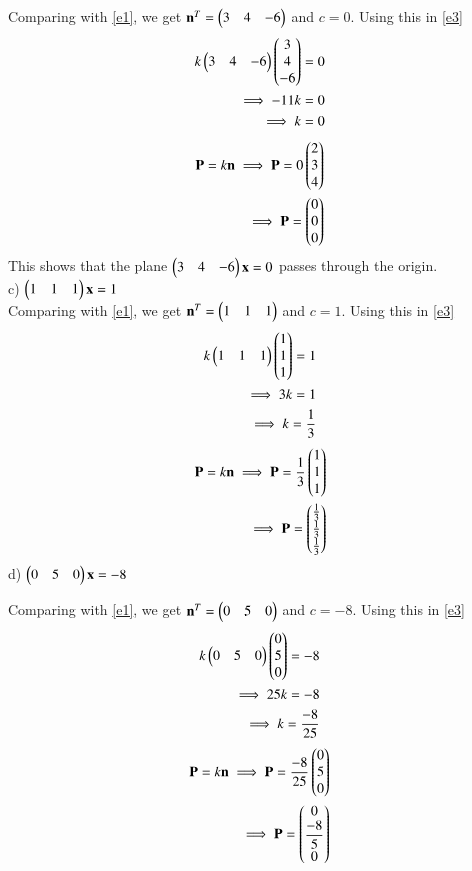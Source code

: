 \documentclass[journal,12pt,twocolumn]{IEEEtran}
\begin{document}
Comparing with \eqref{e1}, we get $\mathbf{n}^T = \begin{pmatrix}3&4&-6\end{pmatrix}$ and  $c=0$. Using this in \eqref{e3}
\begin{align}
	k\begin{pmatrix}3&4&-6\end{pmatrix}\begin{pmatrix}3\\4\\-6\end{pmatrix} = 0\\
	\implies -11k = 0\\
	\implies k = 0
\end{align}
\begin{align}
	\mathbf{P} = k\mathbf{n}
	\implies\mathbf{P} = 0\begin{pmatrix}2\\3\\4\end{pmatrix}\\
	\implies\mathbf{P}= \begin{pmatrix}0\\0\\0\end{pmatrix}
\end{align}
This shows that the plane $\begin{pmatrix}3&4&-6\end{pmatrix}\mathbf{x} = 0$ passes through the origin.\\

c) $\begin{pmatrix}1&1&1\end{pmatrix}\mathbf{x} = 1$\\

Comparing with \eqref{e1}, we get $\mathbf{n}^T = \begin{pmatrix}1&1&1\end{pmatrix}$ and  $c=1$. Using this in \eqref{e3}
\begin{align}
	k\begin{pmatrix}1&1&1\end{pmatrix}\begin{pmatrix}1\\1\\1\end{pmatrix} = 1\\
	\implies 3k = 1\\
	\implies k = \frac{1}{3}
\end{align}
\begin{align}
	\mathbf{P} = k\mathbf{n}
	\implies\mathbf{P} = \frac{1}{3}\begin{pmatrix}1\\1\\1\end{pmatrix}\\
	\implies\mathbf{P}= \begin{pmatrix}\frac{1}{3}\\\frac{1}{3}\\\frac{1}{3}\end{pmatrix}
\end{align}
d) $\begin{pmatrix}0&5&0\end{pmatrix}\mathbf{x} = -8$

Comparing with \eqref{e1}, we get $\mathbf{n}^T = \begin{pmatrix}0&5&0\end{pmatrix}$ and  $c=-8$. Using this in \eqref{e3}
\begin{align}
	k\begin{pmatrix}0&5&0\end{pmatrix}\begin{pmatrix}0\\5\\0\end{pmatrix} = -8\\
	\implies 25k = -8\\
	\implies k = \frac{-8}{25}
\end{align}
\begin{align}
	\mathbf{P} = k\mathbf{n}
	\implies\mathbf{P} = \frac{-8}{25}\begin{pmatrix}0\\5\\0\end{pmatrix}\\
	\implies\mathbf{P}= \begin{pmatrix}0\\\dfrac{-8}{5}\\0\end{pmatrix}
\end{align}
\end{document}
